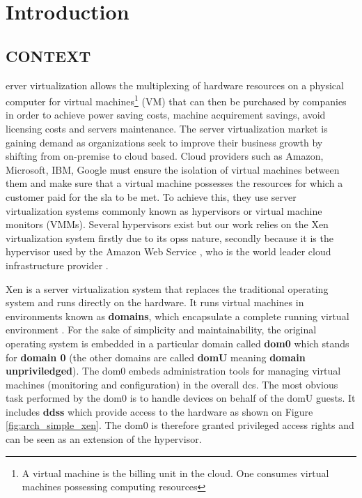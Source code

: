%
%
\let\textcircled=\pgftextcircled
\chapter*{Introduction}
\label{chap:intro}
\section*{CONTEXT}
erver virtualization allows the multiplexing of hardware resources on a physical computer for virtual machines\footnote{A virtual machine is the billing unit in the cloud. One consumes virtual machines possessing computing resources} (VM) that can then be purchased by companies in order to achieve power saving costs, machine acquirement savings, avoid licensing costs and servers maintenance. The server virtualization market is gaining demand as organizations seek to improve their business growth by shifting from on-premise to cloud based. Cloud providers such as Amazon, Microsoft, IBM, Google must ensure the isolation of virtual machines between them and make sure that a virtual machine possesses the resources for which a customer paid for the \acrshort{sla} to be met. To achieve this, they use server virtualization systems commonly known as hypervisors or virtual machine monitors (VMMs). Several hypervisors exist but our work relies on the Xen virtualization system firstly due to its \glspl{ops} nature, secondly because it is the hypervisor used by the Amazon Web Service \citep{aws-ec2}, who is the world leader cloud infrastructure provider \citep{aws-leader}. 

\par Xen is a server virtualization system that replaces the traditional operating system and runs directly on the hardware. It runs virtual machines in environments known as \textbf{domains}, which encapsulate a complete running virtual environment \citep{xen_book}. For the sake of simplicity and maintainability, the original operating system is embedded in a particular domain called \textbf{dom0} which stands for \textbf{domain 0} (the other domains are called \textbf{domU} meaning \textbf{domain unpriviledged}). The dom0 embeds administration tools for managing virtual machines (monitoring and configuration) in the overall \glspl{dc}. The most obvious task performed by the dom0 is to handle devices on behalf of the domU guests. It  includes \textbf{\glspl{dd}s} which provide access to the hardware as shown on Figure \ref{fig:arch_simple_xen}. The dom0 is therefore granted privileged access rights and can be seen as an extension of the hypervisor.

